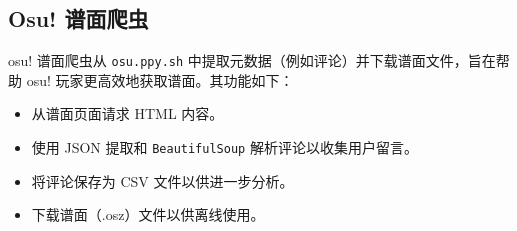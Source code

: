 \documentclass[12pt]{article}
\begin{document}
\subsection{Osu! 谱面爬虫}
osu! 谱面爬虫从 \texttt{osu.ppy.sh} 中提取元数据（例如评论）并下载谱面文件，旨在帮助 osu! 玩家更高效地获取谱面。其功能如下：

\begin{itemize}
    \item 从谱面页面请求 HTML 内容。
    \item 使用 JSON 提取和 \texttt{BeautifulSoup} 解析评论以收集用户留言。
    \item 将评论保存为 CSV 文件以供进一步分析。
    \item 下载谱面（.osz）文件以供离线使用。
\end{itemize}
\end{document}
